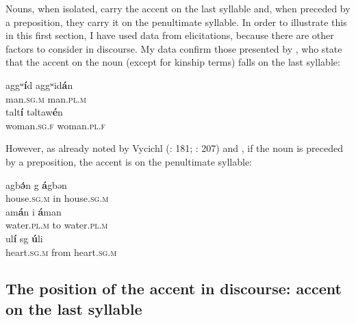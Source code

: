 \documentclass[output=paper]{langsci/langscibook}
\begin{document}
Nouns, when isolated, carry the accent on the last syllable and, when preceded by a preposition, they carry it on the penultimate syllable. In order to illustrate this in this first section, I have used data from elicitations, because there are other factors to consider in discourse. My data confirm those presented by \cite{louali:philippson:05}, who state that the accent on the noun (except for kinship terms) falls on the last syllable:

\begin{exe}
\ex\label{5ex:1}
\gll	aggʷ{\textbf{í}}d		\hspace*{1.4cm} aggʷid{\textbf{á}}n \\
	man.{\textsc{sg.m}}		{} man.{\textsc{pl.m}} \\
\glt
\ex\label{5ex:2}
\gll	talt{\textbf{í}}			\hspace*{1cm} təltaw{\textbf{é}}n \\
	woman.{\textsc{sg.f}}	{} woman.{\textsc{pl.f}} \\
\glt
\end{exe}

However, as already noted by Vycichl (\citeyear{vycichl:81}: 181; \citeyear{vycichl:05}: 207) and \cite[][12]{louali:philippson:05}, if the noun is preceded by a preposition, the accent is on the penultimate syllable:

\begin{exe}
\ex\label{5ex:3}
\gll	agb{\textbf{ə́}}n		\hspace*{0.95cm}	g 	{\textbf{á}}gbən \\
	house.{\textsc{sg.m}}	{} in 	house.{\textsc{sg.m}} \\
\glt
\ex\label{5ex:4}
\gll	am{\textbf{á}}n		\hspace*{1cm}	i	{\textbf{á}}man \\
	water.{\textsc{pl.m}}	{} to 	water.{\textsc{pl.m}} \\
\glt
\ex\label{5ex:4}		
\gll	ul{\textbf{í}}			\hspace*{1cm}	sg 	{\textbf{ú}}li \\
	heart.{\textsc{sg.m}}	{} from	heart.{\textsc{sg.m}} \\
\glt
\end{exe}


\subsection{The position of the accent in discourse: accent on the last syllable}\label{5sec:22}
\end{document}
